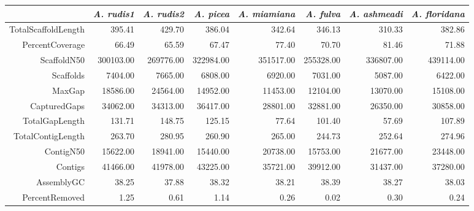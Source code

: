 \begin{table}[ht]
\centering
\begin{tabular}{rrrrrrrr}
  \hline
 & {\emph{A. rudis1}} & {\emph{A. rudis2}} & {\emph{A. picea}} & {\emph{A. miamiana}} & {\emph{A. fulva}} & {\emph{A. ashmeadi}} & {\emph{A. floridana}} \\ 
  \hline
TotalScaffoldLength & 395.41 & 429.70 & 386.04 & 342.64 & 346.13 & 310.33 & 382.86 \\ 
  PercentCoverage & 66.49 & 65.59 & 67.47 & 77.40 & 70.70 & 81.46 & 71.88 \\ 
  ScaffoldN50 & 300103.00 & 269776.00 & 322984.00 & 351517.00 & 255328.00 & 336807.00 & 439114.00 \\ 
  Scaffolds & 7404.00 & 7665.00 & 6808.00 & 6920.00 & 7031.00 & 5087.00 & 6422.00 \\ 
  MaxGap & 18586.00 & 24564.00 & 14952.00 & 11453.00 & 12104.00 & 13070.00 & 15108.00 \\ 
  CapturedGaps & 34062.00 & 34313.00 & 36417.00 & 28801.00 & 32881.00 & 26350.00 & 30858.00 \\ 
  TotalGapLength & 131.71 & 148.75 & 125.15 & 77.64 & 101.40 & 57.69 & 107.89 \\ 
  TotalContigLength & 263.70 & 280.95 & 260.90 & 265.00 & 244.73 & 252.64 & 274.96 \\ 
  ContigN50 & 15622.00 & 18941.00 & 15440.00 & 20738.00 & 15753.00 & 21677.00 & 23448.00 \\ 
  Contigs & 41466.00 & 41978.00 & 43225.00 & 35721.00 & 39912.00 & 31437.00 & 37280.00 \\ 
  AssemblyGC & 38.25 & 37.88 & 38.32 & 38.21 & 38.39 & 38.27 & 38.03 \\ 
  PercentRemoved & 1.25 & 0.61 & 1.14 & 0.26 & 0.02 & 0.30 & 0.24 \\ 
   \hline
\end{tabular}
\end{table}
